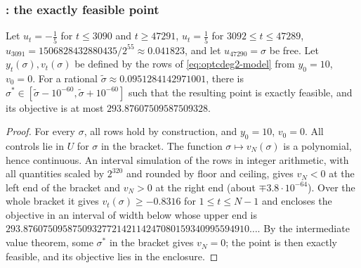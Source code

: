 \begin{certbox}
\end{certbox}

\subsubsection{: the exactly feasible point}\label{app:optcdeg2-point}

\begin{proposition}\label{prop:optcdeg2-point}
Let $u_t=-\tfrac15$ for $t\le3090$ and $t\ge47291$, $u_t=\tfrac15$ for $3092\le t\le47289$, $u_{3091}=1506828432880435/2^{55}\approx0.041823$, and let $u_{47290}=\sigma$ be free.
Let $y_t(\sigma),v_t(\sigma)$ be defined by the rows of \eqref{eq:optcdeg2-model} from $y_0=10$, $v_0=0$.
For a rational $\tilde\sigma\approx0.0951284142971001$, there is $\sigma^*\in[\tilde\sigma-10^{-60},\tilde\sigma+10^{-60}]$ such that the resulting point is exactly feasible, and its objective is at most $293.87607509587509328$.
\end{proposition}

\begin{proof}
For every $\sigma$, all rows hold by construction, and $y_0=10$, $v_0=0$.
All controls lie in $U$ for $\sigma$ in the bracket.
The function $\sigma\mapsto v_N(\sigma)$ is a polynomial, hence continuous.
An interval simulation of the rows in integer arithmetic, with all quantities scaled by $2^{320}$ and rounded by floor and ceiling, gives $v_N<0$ at the left end of the bracket and $v_N>0$ at the right end (about $\mp3.8\cdot10^{-64}$).
Over the whole bracket it gives $v_t(\sigma)\ge-0.8316$ for $1\le t\le N-1$ and encloses the objective in an interval of width below  whose upper end is $293.8760750958750932772142114247080159340995594910\ldots$.
By the intermediate value theorem, some $\sigma^*$ in the bracket gives $v_N=0$; the point is then exactly feasible, and its objective lies in the enclosure.
\end{proof}

